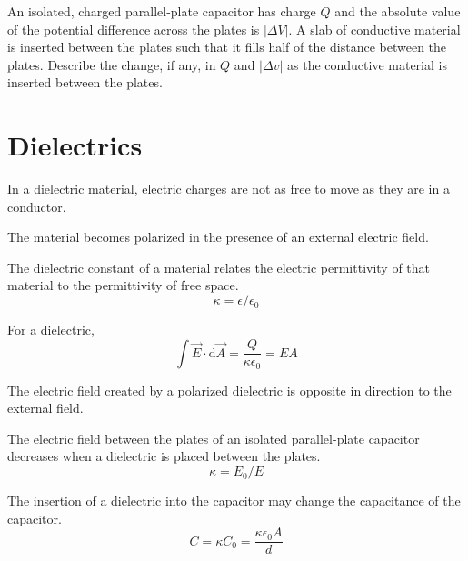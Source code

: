 \documentclass[../em.tex]{subfiles}
\begin{document}
\ex An isolated, charged parallel-plate capacitor has charge $Q$ and the absolute value of the potential difference across the plates is $|\Delta V|$. 
A slab of conductive material is inserted between the plates such that it fills half of the distance between the plates. 
Describe the change, if any, in $Q$ and $|\Delta v|$ as the conductive material is inserted between the plates.

\section{Dielectrics}
In a dielectric material, electric charges are not as free to move as they are in a conductor.

The material becomes polarized in the presence of an external electric field.

The dielectric constant of a material relates the electric permittivity of that material to the permittivity of free space.
\[\kappa = \epsilon/\epsilon_0\]

For a dielectric, 
\[\int \vec{E}\cdot \mathrm{d}\vec{A} = \frac{Q}{\kappa \epsilon_0}=EA \]

The electric field created by a polarized dielectric is opposite in direction to the external field.

The electric field between the plates of an isolated parallel-plate capacitor decreases when a 
dielectric is placed between the plates.
\[\kappa = E_0/E\]

The insertion of a dielectric into the capacitor may change the capacitance of the capacitor.
\[C = \kappa C_0 = \frac{\kappa \epsilon_0 A}{d}\]
\end{document}
